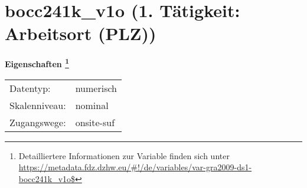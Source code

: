 
    \setcounter{footnote}{0}

    \vspace*{-1.8cm}
	\section{bocc241k\_v1o (1. Tätigkeit: Arbeitsort (PLZ))}
	\label{section:bocc241k_v1o}



    \vspace*{0.5cm}
    \noindent\textbf{Eigenschaften
	\footnote{Detailliertere Informationen zur Variable finden sich unter
		\url{https://metadata.fdz.dzhw.eu/\#!/de/variables/var-gra2009-ds1-bocc241k_v1o$}}}\\
	\begin{tabularx}{\hsize}{@{}lX}
	Datentyp: & numerisch \\
	Skalenniveau: & nominal \\
	Zugangswege: &
	  onsite-suf
 \\
    \end{tabularx}



